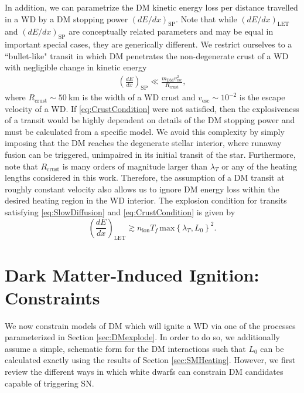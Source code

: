 \documentclass[twocolumn,showpacs,preprintnumbers,amsmath,amssymb,prd]{revtex4}
\begin{document}
In addition, we can parametrize the DM kinetic energy loss per distance travelled in a WD by a DM stopping power $(dE/dx)_\text{SP}$. 
Note that while $(dE/dx)_\text{LET}$ and $(dE/dx)_\text{SP}$ are conceptually related parameters and may be equal in important special cases, they are generically different.
We restrict ourselves to a ``bullet-like" transit in which DM penetrates the non-degenerate crust of a WD with negligible change in kinetic energy
\begin{align}
\label{eq:CrustCondition}
  \left( \frac{d E}{d x} \right)_\text{SP} \ll 
  \frac{m_\text{DM} v^2_\text{esc}}{R_\text{crust}},
\end{align}
where $R_\text{crust} \sim 50 ~\text{km}$ is the width of a WD crust and $v_\text{esc} \sim 10^{-2}$ is the escape velocity of a WD. 
If \eqref{eq:CrustCondition} were not satisfied, then the explosiveness of a transit would be highly dependent on details of the DM stopping power and must be calculated from a specific model.
We avoid this complexity by simply imposing that the DM reaches the degenerate stellar interior, where runaway fusion can be triggered, unimpaired in its initial transit of the star. 
Furthermore, note that $R_\text{crust}$ is many orders of magnitude larger than $\lambda_T$ or any of the heating lengths considered in this work. 
Therefore, the assumption of a DM transit at roughly constant velocity also allows us to ignore DM energy loss within the desired heating region in the WD interior. 
The explosion condition for transits satisfying \eqref{eq:SlowDiffusion} and \eqref{eq:CrustCondition} is given by
\begin{equation}
\label{eq:transitexplosion}
  \left( \frac{d E}{d x} \right)_\text{LET} \gtrsim n_\text{ion} T_f\, \text{max}\left\{\lambda_T, L_0 \right\}^2.
\end{equation}

\section{Dark Matter-Induced Ignition: Constraints}
\label{sec:Constraints}

We now constrain models of DM which will ignite a WD via one of the processes parameterized in Section \ref{sec:DMexplode}.
In order to do so, we additionally assume a simple, schematic form for the DM interactions such that $L_0$ can be calculated exactly using the results of Section \ref{sec:SMHeating}.
However, we first review the different ways in which white dwarfs can constrain DM candidates capable of triggering SN. 
\end{document}
